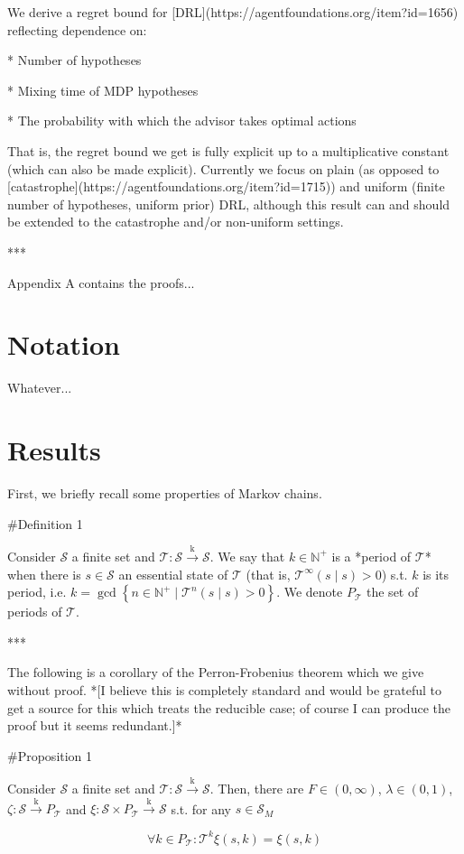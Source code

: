 \documentclass[a4paper]{article}
\newcommand{\AC}[1]{\left\{#1\right\}}
\newcommand{\Nats}{\mathbb{N}}
\newcommand{\M}{\xrightarrow{\text{k}}}
\newcommand{\St}{\mathcal{S}}
\newcommand{\T}{\mathcal{T}}
\newcommand{\Pd}{P}
\begin{document}
We derive a regret bound for [DRL](https://agentfoundations.org/item?id=1656) reflecting dependence on:

* Number of hypotheses

* Mixing time of MDP hypotheses

* The probability with which the advisor takes optimal actions

That is, the regret bound we get is fully explicit up to a multiplicative constant (which can also be made explicit). Currently we focus on plain (as opposed to [catastrophe](https://agentfoundations.org/item?id=1715)) and uniform (finite number of hypotheses, uniform prior) DRL, although this result can and should be extended to the catastrophe and/or non-uniform settings.

***

Appendix A contains the proofs...

\section{Notation}

Whatever...

\section{Results}

First, we briefly recall some properties of Markov chains.

\#Definition 1

Consider $\St$ a finite set and $\T: \St \M \St$. We say that $k \in \Nats^+$ is a *period of $\T$* when there is $s \in \St$ an essential state of $\T$ (that is, $\T^\infty(s \mid s) > 0$) s.t. $k$ is its period, i.e. $k = \gcd \AC{n \in \Nats^+ \mid \T^n(s \mid s) > 0}$. We denote $\Pd_\T$ the set of periods of $\T$.

***

The following is a corollary of the Perron-Frobenius theorem which we give without proof. *[I believe this is completely standard and would be grateful to get a source for this which treats the reducible case; of course I can produce the proof but it seems redundant.]*

\#Proposition 1

Consider $\St$ a finite set and $\T: \St \M \St$. Then, there are $F \in (0,\infty)$, $\lambda\in(0,1)$, $\zeta: \St \M \Pd_\T$ and $\xi: \St \times \Pd_\T \M \St$ s.t. for any $s \in \St_M$

$$\forall k \in \Pd_\T: \T^k \xi(s,k) = \xi(s,k)$$
\end{document}
